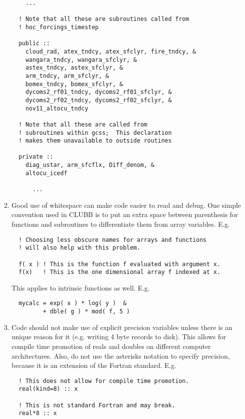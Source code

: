 \documentclass[letterpaper,12pt]{article}
\begin{document}
\begin{enumerate}
\begin{verbatim}
    ...

  ! Note that all these are subroutines called from 
  ! hoc_forcings_timestep

  public ::
    cloud_rad, atex_tndcy, atex_sfclyr, fire_tndcy, &
    wangara_tndcy, wangara_sfclyr, &
    astex_tndcy, astex_sfclyr, &
    arm_tndcy, arm_sfclyr, &
    bomex_tndcy, bomex_sfclyr, &
    dycoms2_rf01_tndcy, dycoms2_rf01_sfclyr, &
    dycoms2_rf02_tndcy, dycoms2_rf02_sfclyr, &
    nov11_altocu_tndcy 

  ! Note that all these are called from 
  ! subroutines within gcss;  This declaration
  ! makes them unavailable to outside routines

  private ::
    diag_ustar, arm_sfcflx, Diff_denom, &
    altocu_icedf

      ...

\end{verbatim}

\item Good use of whitespace can make code easier to read and debug.  
One simple convention used in CLUBB is to put an extra space between 
parenthesis for functions and subroutines to differentiate them from 
array variables. \newline
E.g.
\begin{verbatim}
  ! Choosing less obscure names for arrays and functions 
  ! will also help with this problem.

  f( x ) ! This is the function f evaluated with argument x.
  f(x)   ! This is the one dimensional array f indexed at x.
\end{verbatim}

This applies to intrinsic functions as well. \newline
E.g.
\begin{verbatim}
  mycalc = exp( x ) * log( y )  &
         + dble( g ) * mod( f, 5 )
\end{verbatim}

\item Code should not make use of explicit precision variables unless there is 
an unique reason for it (e.g. writing 4 byte records to disk).  This allows for 
compile time promotion of reals and doubles on different computer architectures.
Also, do not use the asterisks notation to specify precision, because it
is an extension of the Fortran standard.  E.g.
\begin{verbatim}
  ! This does not allow for compile time promotion.
  real(kind=8) :: x  

  ! This is not standard Fortran and may break.
  real*8 :: x


\end{verbatim}
\end{enumerate}
\end{document}
